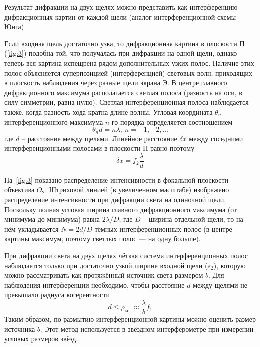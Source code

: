 \documentclass[12pt]{article}
\begin{document}
    Результат дифракции на двух щелях можно представить как интерференцию дифракционных картин от каждой щели (аналог интерференционной схемы Юнга)

    Если входная щель достаточно узка, то дифракционная картина в плоскости П (\figurename{\ref{fig:3}})
    подобна той, что получалась при дифракции на одной щели, однако теперь вся картина
    испещрена рядом дополнительных узких полос.
    Наличие этих полос объясняется суперпозицией (интерференцией) световых волн,
    приходящих в плоскость наблюдения через разные щели экрана Э.
    В центре главного дифракционного максимума располагается светлая полоса (разность на оси, в силу симметрии, равна нулю).
    Светлая интерференционная полоса наблюдается также, когда разность хода кратна длине волны.
    Угловая координата $\theta_n$ интерференционного максимума $n$-го порядка определяется соотношением
    \begin{equation}
        \theta_n d = n\lambda,\ n = \pm1, \pm2,\dots
        \label{eq:4}
    \end{equation}
    где $d$ -- расстояние между щелями.
    Линейное расстояние $\delta x$ между соседними интерференционными полосами в плоскости П равно поэтому
    \begin{equation}
        \delta x = f_2 \frac{\lambda}{d}
        \label{eq:5}
    \end{equation}

    На\ \figurename{\ref{fig:3}} показано распределение интенсивности в фокальной плоскости объектива $O_2$.
    Штриховой линией (в увеличенном масштабе) изображено распределение интенсивности
    при дифракции света на одиночной щели.
    Поскольку полная угловая ширина главного дифракционного максимума (от минимума до минимума) равна $2\lambda/D$,
    где $D$ -- ширина отдельной щели, то на нём укладывается $N =2d/D$ тёмных интерференционных полос
    (в центре картины максимум, поэтому светлых полос — на одну больше).

    При дифракции света на двух щелях чёткая система интерференционных полос
    наблюдается только при достаточно узкой ширине входной щели ($s_2$), которую можно рассматривать как протяжённый источник света размером $b$.
    Для наблюдения интерференции необходимо, чтобы расстояние $d$ между щелями не превышало радиуса когерентности
    \begin{equation}
        d \le \rho_{ког} \approx \frac{\lambda}{b}f_1
        \label{eq:6}
    \end{equation}
    Таким образом, по размытию интерференционной картины можно оценить размер источника $b$.
    Этот метод используется в звёздном интерферометре при измерении угловых размеров звёзд.
\end{document}
